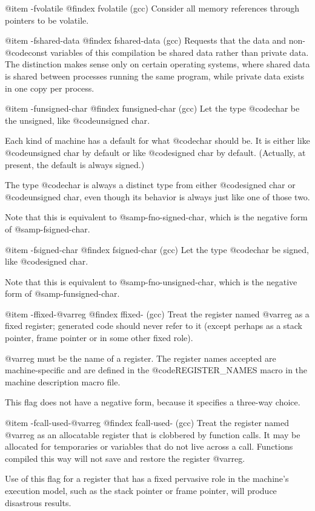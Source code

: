 {@item -fvolatile
@findex fvolatile (gcc)
Consider all memory references through pointers to be volatile.

@item -fshared-data
@findex fshared-data (gcc)
Requests that the data and non-@code{const} variables of this
compilation be shared data rather than private data.  The distinction
makes sense only on certain operating systems, where shared data is
shared between processes running the same program, while private data
exists in one copy per process.

@item -funsigned-char
@findex funsigned-char (gcc)
Let the type @code{char} be the unsigned, like @code{unsigned char}.

Each kind of machine has a default for what @code{char} should
be. It is either like @code{unsigned char} by default or like
@code{signed char} by default.  (Actually, at present, the
default is always signed.)

The type @code{char} is always a distinct type from either
@code{signed char} or @code{unsigned char}, even though its
behavior is always just like one of those two.

Note that this is equivalent to @samp{-fno-signed-char}, which is the
negative form of @samp{-fsigned-char}.

@item -fsigned-char
@findex fsigned-char (gcc)
Let the type @code{char} be signed, like @code{signed char}.

Note that this is equivalent to @samp{-fno-unsigned-char}, which is
the negative form of @samp{-funsigned-char}.

@item -ffixed-@var{reg}
@findex ffixed- (gcc)
Treat the register named @var{reg} as a fixed register; generated
code should never refer to it (except perhaps as a stack pointer,
frame pointer or in some other fixed role).

@var{reg} must be the name of a register. The register names
accepted are machine-specific and are defined in the
@code{REGISTER_NAMES} macro in the machine description macro
file.

This flag does not have a negative form, because it specifies a
three-way choice.

@item -fcall-used-@var{reg}
@findex fcall-used- (gcc)
Treat the register named @var{reg} as an allocatable register
that is clobbered by function calls.  It may be allocated for
temporaries or variables that do not live across a call.
Functions compiled this way will not save and restore the
register @var{reg}.

Use of this flag for a register that has a fixed pervasive role
in the machine's execution model, such as the stack pointer or
frame pointer, will produce disastrous results.

}
